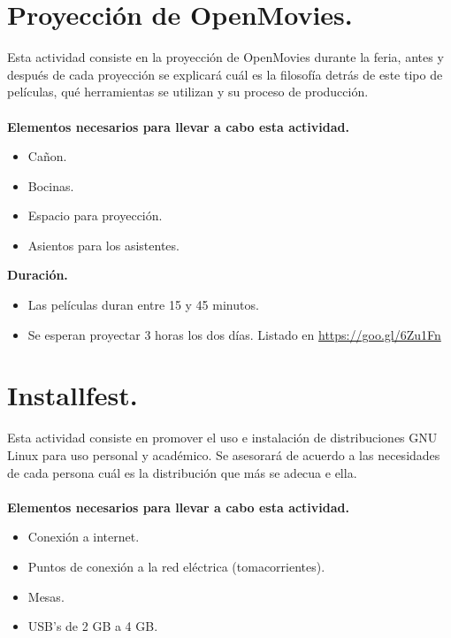 \documentclass[a4paper,11pt]{article}                 %
\begin{document}
\begin{landscape}
\begin{table}[H]
\end{table}
  
  
  \end{landscape}
  
  \section{Proyección de OpenMovies.}                                     %
  
  Esta actividad consiste en la proyección de OpenMovies durante la feria, antes y después de cada proyección se explicará cuál es la filosofía detrás de este tipo de películas, qué herramientas se utilizan y su proceso de producción.
  \paragraph{}
 \textbf{Elementos necesarios para llevar a cabo esta actividad.}
  \begin{itemize}
    \label{list:openmovies}
    \item Cañon.
    \item Bocinas.
    \item Espacio para proyección.
    \item Asientos para los asistentes.
  \end{itemize}
  
  \textbf{Duración.}
  \begin{itemize}
    \item Las películas duran entre 15 y 45 minutos.
    \item Se esperan proyectar 3 horas los dos días. Listado en 
    \url{https://goo.gl/6Zu1Fn}
  \end{itemize}
  
  
    \section{Installfest.}                                     %
    Esta actividad consiste en promover el uso e instalación de distribuciones GNU Linux para uso personal y académico. Se asesorará de acuerdo a las necesidades de cada persona cuál es la distribución que más se adecua e ella.
  \paragraph{}
   \textbf{Elementos necesarios para llevar a cabo esta actividad.}
  \begin{itemize}
    \label{list:installfest}
    \item Conexión a internet.
    \item Puntos de conexión a la red eléctrica (tomacorrientes).
    \item Mesas.
    \item USB's de 2 GB a 4 GB.
  \end{itemize}
  
\end{document}
